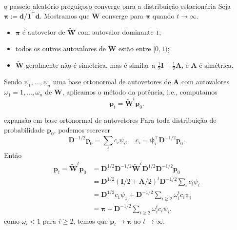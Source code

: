 \documentclass{beamer}
\begin{document}
\begin{frame}{o passeio aleatório preguiçoso converge para a distribuição estacionária}
    Seja \(\mathbf{\pi} := \mathbf{d} / \mathbf{1}^\intercal\mathbf{d}\). Mostramos que \(\widetilde{\mathbf{W}}\) converge para \(\mathbf{\pi}\) quando \(t \to \infty\).\pause
    \begin{itemize}
        \item \(\mathbf{\pi}\) é autovetor de \(\widetilde{\mathbf{W}}\) com autovalor dominante \(1\);
        \item todos os outros autovalores de \(\widetilde{\mathbf{W}}\) estão entre \([0,1)\);
        \item \(\widetilde{\mathbf{W}}\) geralmente \alert{não} é simétrica, mas é similar a \(\frac{1}{2}\mathbf{I} + \frac{1}{2}\mathbf{A}\), e \(\mathbf{A}\) é simétrica.\pause
    \end{itemize}
    Sendo \(\psi_1, \ldots, \psi_n\) uma base ortonormal de autovetores de \(\mathbf{A}\) com autovalores \(\omega_1 = 1, \ldots, \omega_n\) de \(\widetilde{\mathbf{W}}\), aplicamos o método da potência, i.e., computamos
    \begin{equation*}
        \mathbf{p}_t = \widetilde{\mathbf{W}}^t \mathbf{p}_0.
    \end{equation*}
\end{frame}

\begin{frame}{expansão em base ortonormal de autovetores}
    Para toda distribuição de probabilidade \(\mathbf{p}_0\), podemos escrever
    \begin{equation*}
        \mathbf{D}^{-1/2}\mathbf{p}_0 = \sum_{i} c_i \psi_i, \quad c_i = \mathbf{\psi}_i^\intercal \mathbf{D}^{-1/2} \mathbf{p}_0.
    \end{equation*} \pause Então
    \begin{align*}
        \mathbf{p}_t = \widetilde{\mathbf{W}}^t\mathbf{p}_0  &= \mathbf{D}^{1/2}\mathbf{D}^{-1/2}\widetilde{\mathbf{W}}^t\mathbf{D}^{1/2}\mathbf{D}^{-1/2} \mathbf{p}_0 \\
        &= \mathbf{D}^{1/2}(\mathbf{I}/2 + \mathbf{A}/2)^t \mathbf{D}^{-1/2} \sum_{i} c_i \psi_i \\
        &= \mathbf{D}^{1/2}c_1\psi_1 + \mathbf{D}^{-1/2} \sum_{i \geq 2} \omega_i^t c_i \psi_i \\
        &= \mathbf{\pi} + \mathbf{D}^{-1/2} \sum_{i \geq 2} \omega_i^t c_i \psi_i.
    \end{align*} \pause como \(\omega_i < 1\) para \(i \geq 2\), temos que \(\mathbf{p}_t \to \mathbf{\pi}\) ao \(t \to \infty\).
\end{frame}
\end{document}
